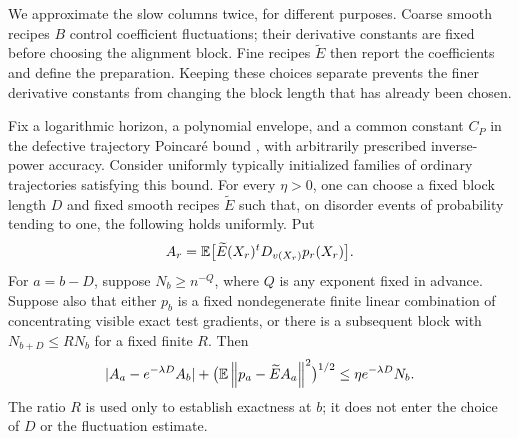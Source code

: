 We approximate the slow columns twice, for different purposes.  Coarse
smooth recipes $B$ control coefficient fluctuations; their derivative
constants are fixed before choosing the alignment block.  Fine recipes
$\widetilde E$ then report the coefficients and define the preparation.
Keeping these choices separate prevents the finer derivative constants
from changing the block length that has already been chosen.

\begin{proposition}
\label{prop:cutoff-coefficients}
Fix a logarithmic horizon, a polynomial envelope, and a common
constant $C_P$ in the defective trajectory Poincar\'e bound
, with arbitrarily prescribed
inverse-power accuracy.  Consider uniformly typically initialized
families of ordinary trajectories satisfying this bound.
For every $\eta>0$, one can choose a fixed block length $D$ and fixed
smooth recipes $\widetilde E$ such that, on disorder events of
probability tending to one, the following holds uniformly.
Put
\[
 A_r=\mathbb E\bigl[\widetilde E(X_r)^tD_{v(X_r)}p_r(X_r)\bigr].
\]
For $a=b-D$, suppose $N_b\ge n^{-Q}$, where $Q$ is any exponent
fixed in advance.  Suppose also that either $p_b$ is a fixed
nondegenerate finite linear combination of concentrating visible
exact test gradients, or there is a subsequent block with
$N_{b+D}\le R N_b$ for a fixed finite $R$.
Then
\begin{equation}
 |A_a-e^{-\lambda D}A_b|
 +\bigl(\mathbb E\left\lVert p_a-\widetilde E A_a\right\rVert^2\bigr)^{1/2}
 \le\eta e^{-\lambda D}N_b.
 \label{eq:cutoff-alignment}
\end{equation}
The ratio $R$ is used only to establish exactness at $b$; it does not
enter the choice of $D$ or the fluctuation estimate.
\end{proposition}

